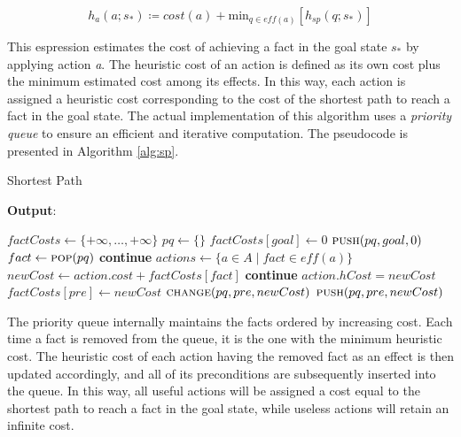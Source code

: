 \begin{equation}
	\label{eq:spcost}
	h_a\left(a;s_*\right) \coloneqq cost(a) + \text{min}_{q \in \textit{eff}\left(a\right)} \left[h_{sp}\left(q;s_*\right)\right]
\end{equation}

This espression estimates the cost of achieving a fact in the goal state $s_*$ by applying
action \textit{a}. The heuristic cost of an action is defined as its own cost plus the minimum estimated cost among its effects.
In this way, each action is assigned a heuristic cost corresponding to the cost of the shortest path to reach
a fact in the goal state.
The actual implementation of this algorithm uses a \textit{priority queue} to ensure an
efficient and iterative computation. The pseudocode is presented in Algorithm \ref{alg:sp}.

\begin{algorithm}
	\caption{Shortest Path}
	\label{alg:sp}
	\hspace*{0.5em} \textbf{Output}:
	\begin{algorithmic}[1]
		\State $factCosts \gets \{+\infty, \dots, +\infty\}$ 
		\State $pq\gets \{\}$ 
		\State $factCosts[goal] \gets 0$
		\State $\Call{push}{pq, goal, 0}$
		\EndFor
		\State $fact \gets \Call{pop}{pq}$ 
		\State \textbf{continue} 
		\EndIf
		\State $actions \gets \{a \in A \mid fact \in \textit{eff}\left(a\right)\}$
		\State $newCost \gets action.cost + factCosts[fact]$
		\State \textbf{continue}
		\EndIf
		\State $action.hCost = newCost$
		\State $factCosts[pre] \gets newCost$
		\State $\Call{change}{pq, pre, newCost}$
		\Else
		\State $\Call{push}{pq, pre, newCost}$
		\EndIf
		\EndIf
		\EndFor
		\EndFor
		\EndWhile
		\EndProcedure
	\end{algorithmic}
\end{algorithm}

The priority queue internally maintains the facts ordered by increasing cost.
Each time a fact is removed from the queue, it is the one with the minimum heuristic cost.
The heuristic cost of each action having the removed fact as an effect is then updated accordingly,
and all of its preconditions are subsequently inserted into the queue.
In this way, all useful actions will be assigned a cost equal to the shortest path to reach a fact in
the goal state, while useless actions will retain an infinite cost.

